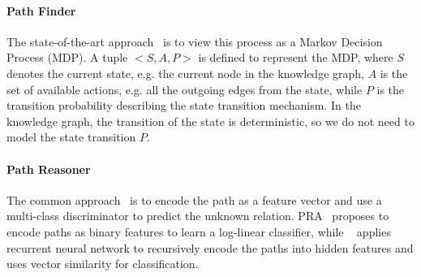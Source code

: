 \documentclass[11pt,a4paper]{article}
\begin{document}
\paragraph{Path Finder}
The state-of-the-art approach~\cite{xiong2017deeppath,das2017go} is to view this process as a Markov Decision Process (MDP). A tuple $<S, A, P>$ is defined to represent the MDP, where $S$ denotes the current state, e.g. the current node in the knowledge graph, $A$ is the set of available actions, e.g. all the outgoing edges from the state, while $P$ is the transition probability describing the state transition mechanism. In the knowledge graph, the transition of the state is deterministic, so we do not need to model the state transition $P$.
\paragraph{Path Reasoner}
The common approach~\cite{lao2011random,neelakantan2015compositional,das2016chains} is to encode the path as a feature vector and use a multi-class discriminator to predict the unknown relation. PRA~\cite{lao2011random} proposes to encode paths as binary features to learn a log-linear classifier, while ~\cite{das2016chains} applies recurrent neural network to recursively encode the paths into hidden features and uses vector similarity for classification. 
\end{document}
